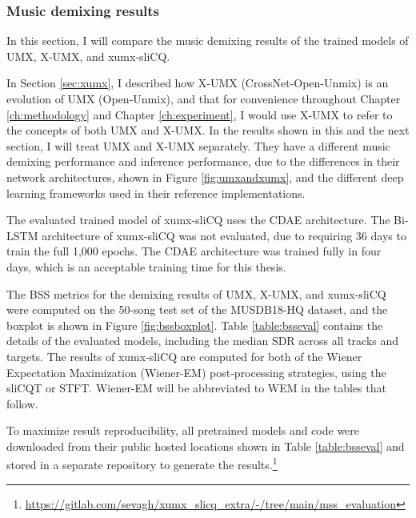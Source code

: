 \documentclass[report.tex]{subfiles}
\begin{document}
\subsubsection{Music demixing results}
\label{sec:demixresults}

In this section, I will compare the music demixing results of the trained models of UMX, X-UMX, and xumx-sliCQ.

In Section \ref{sec:xumx}, I described how X-UMX (CrossNet-Open-Unmix) is an evolution of UMX (Open-Unmix), and that for convenience throughout Chapter \ref{ch:methodology} and Chapter \ref{ch:experiment}, I would use X-UMX to refer to the concepts of both UMX and X-UMX. In the results shown in this and the next section, I will treat UMX and X-UMX separately. They have a different music demixing performance and inference performance, due to the differences in their network architectures, shown in Figure \ref{fig:umxandxumx}, and the different deep learning frameworks used in their reference implementations.

The evaluated trained model of xumx-sliCQ uses the CDAE architecture. The Bi-LSTM architecture of xumx-sliCQ was not evaluated, due to requiring 36 days to train the full 1,000 epochs. The CDAE architecture was trained fully in four days, which is an acceptable training time for this thesis.

The BSS metrics for the demixing results of UMX, X-UMX, and xumx-sliCQ were computed on the 50-song test set of the MUSDB18-HQ dataset, and the boxplot is shown in Figure \ref{fig:bssboxplot}. Table \ref{table:bsseval} contains the details of the evaluated models, including the median SDR across all tracks and targets. The results of xumx-sliCQ are computed for both of the Wiener Expectation Maximization (Wiener-EM) post-processing strategies, using the sliCQT or STFT. Wiener-EM will be abbreviated to WEM in the tables that follow.

To maximize result reproducibility, all pretrained models and code were downloaded from their public hosted locations shown in Table \ref{table:bsseval} and stored in a separate repository to generate the results.\footnote{\url{https://gitlab.com/sevagh/xumx_slicq_extra/-/tree/main/mss_evaluation}}
\end{document}
